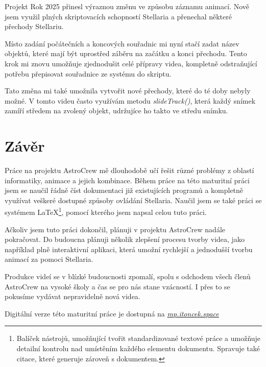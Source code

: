 \documentclass[12pt,a4paper,titlepage]{article}
\newcommand{\link}[2]{\href{#1}{\textcolor{link-color}{\textit{#2}}}}%
\begin{document}
Projekt Rok 2025 přinesl výraznou změnu ve způsobu záznamu animací. Nově jsem využil plných skriptovacích schopností Stellaria a přenechal některé přechody Stellariu. 

Místo zadání počátečních a koncových souřadnic mi nyní stačí zadat název objektů, které mají být uprostřed záběru na začátku a konci přechodu. Tento krok mi znovu umožňuje zjednodušit celé přípravy videa, kompletně odstraňující potřebu přepisovat souřadnice ze systému do skriptu. 

Tato změna mi také umožnila vytvořit nové přechody, které do té doby nebyly možné. V tomto videu často využívám metodu \textit{slideTrack()}, která každý snímek zamíří středem na zvolený objekt, udržujíce ho takto ve středu snímku. %

\section{Závěr}
Práce na projektu AstroCrew mě dlouhodobě učí řešit různé problémy z oblastí informatiky, animace a jejich kombinace. Během práce na této maturitní práci jsem se naučil řádně číst dokumentaci již existujících programů a kompletně využívat veškeré dostupné způsoby ovládání Stellaria. Naučil jsem se také práci se systémem \LaTeX{}\footnote{Balíček nástrojů, umožňující tvořit standardizované textové práce a umožňuje detailní kontrolu nad umístěním každého elementu dokumentu. Spravuje také citace, které generuje zároveň s dokumentem.}, pomocí kterého jsem napsal celou tuto práci.

Ačkoliv jsem tuto práci dokončil, plánuji v projektu AstroCrew nadále pokračovat. Do budoucna plánuji několik zlepšení procesu tvorby videa, jako například plně interaktivní aplikaci, která umožní rychlejší a jednodušší tvorbu animací za pomoci Stellaria. 

Produkce videí se v blízké budoucnosti zpomalí, spolu s odchodem všech členů AstroCrew na vysoké školy a čas se pro nás stane vzácností. I přes to se pokusíme vydávat nepravidelně nová videa.

Digitální verze této maturitní práce je dostupná na \link{https://mp.itoncek.space}{mp.itoncek.space}
\end{document}
